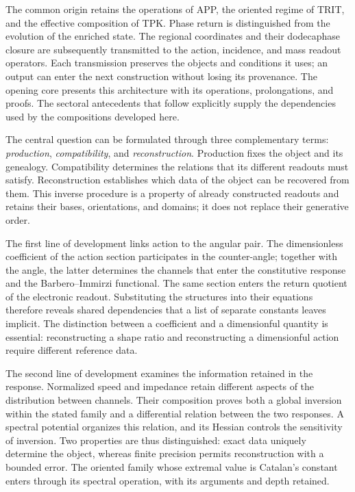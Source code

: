 The common origin retains the operations of APP, the oriented regime of
TRIT, and the effective composition of TPK. Phase return is distinguished
from the evolution of the enriched state. The regional coordinates and
their dodecaphase closure are subsequently transmitted to the action,
incidence, and mass readout operators. Each transmission preserves the
objects and conditions it uses; an output can enter the next construction
without losing its provenance. The opening core presents this architecture
with its operations, prolongations, and proofs. The sectoral antecedents
that follow explicitly supply the dependencies used by the compositions
developed here.

The central question can be formulated through three complementary terms:
\emph{production}, \emph{compatibility}, and \emph{reconstruction}.
Production fixes the object and its genealogy. Compatibility determines
the relations that its different readouts must satisfy. Reconstruction
establishes which data of the object can be recovered from them. This
inverse procedure is a property of already constructed readouts and
retains their bases, orientations, and domains; it does not replace their
generative order.

The first line of development links action to the angular pair. The
dimensionless coefficient of the action section participates in the
counter-angle; together with the angle, the latter determines the channels
that enter the constitutive response and the Barbero--Immirzi functional.
The same section enters the return quotient of the electronic readout.
Substituting the structures into their equations therefore reveals shared
dependencies that a list of separate constants leaves implicit. The
distinction between a coefficient and a dimensionful quantity is
essential: reconstructing a shape ratio and reconstructing a dimensionful
action require different reference data.

The second line of development examines the information retained in the
response. Normalized speed and impedance retain different aspects of the
distribution between channels. Their composition proves both a global
inversion within the stated family and a differential relation between
the two responses. A spectral potential organizes this relation, and its
Hessian controls the sensitivity of inversion. Two properties are thus
distinguished: exact data uniquely determine the object, whereas finite
precision permits reconstruction with a bounded error. The oriented
family whose extremal value is Catalan's constant enters through its
spectral operation, with its arguments and depth retained.

